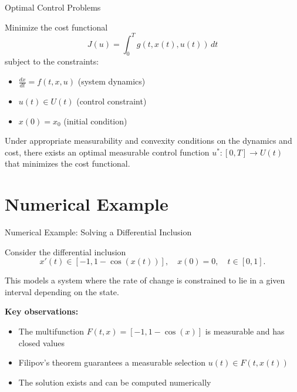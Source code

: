 \documentclass[aspectratio=169,10pt]{beamer}
\begin{document}
\begin{frame}{Optimal Control Problems}
\begin{definition}
Minimize the cost functional
$$J(u) = \int_0^T g(t, x(t), u(t)) \, dt$$
subject to the constraints:
\begin{itemize}
    \item $\frac{dx}{dt} = f(t, x, u)$ (system dynamics)
    \item $u(t) \in U(t)$ (control constraint)
    \item $x(0) = x_0$ (initial condition)
\end{itemize}
\end{definition}

\vspace{0.3cm}

\begin{theorem}
Under appropriate measurability and convexity conditions on the dynamics and cost, there exists an optimal measurable control function $u^*: [0, T] \to U(t)$ that minimizes the cost functional.
\end{theorem}
\end{frame}

\section{Numerical Example}

\begin{frame}[fragile]{Numerical Example: Solving a Differential Inclusion}
\begin{example}
Consider the differential inclusion
$$x'(t) \in [-1, 1 - \cos(x(t))], \quad x(0) = 0, \quad t \in [0, 1].$$

This models a system where the rate of change is constrained to lie in a given interval depending on the state.
\end{example}

\vspace{0.3cm}

\textbf{Key observations:}
\begin{itemize}
    \item The multifunction $F(t, x) = [-1, 1 - \cos(x)]$ is measurable and has closed values
    \item Filipov's theorem guarantees a measurable selection $u(t) \in F(t, x(t))$
    \item The solution exists and can be computed numerically
\end{itemize}
\end{frame}
\end{document}
